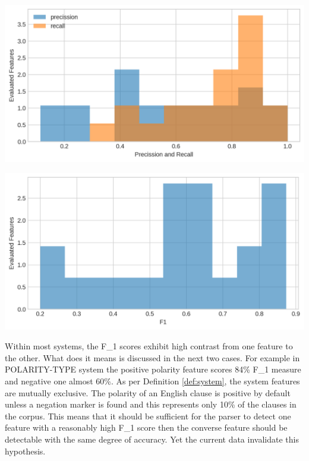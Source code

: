     \begin{minipage}[t]{0.475\textwidth}
        \centering
        \includegraphics[width=\textwidth]{evaluation-results/figures/accuracy-syntactic-mood-precission-recall.png}
        \label{fig:mood-precission-recall}
    \end{minipage}
    \quad
    \begin{minipage}[t]{0.475\textwidth}
        \centering
        \includegraphics[width=\textwidth]{evaluation-results/figures/accuracy-syntactic-mood-f1.png}
        \label{fig:mood-precission-f1}
    \end{minipage}

Within most systems, the F_1 scores exhibit high contrast from one feature to the other. What does it means is discussed in the next two cases. For example in POLARITY-TYPE system the positive polarity feature scores 84\% F_1 measure and negative one almost 60\%. As per Definition \ref{def:system}, the system features are mutually exclusive. The polarity of an English clause is positive by default unless a negation marker is found and this represents only 10\% of the clauses in  the corpus. This means that it should be sufficient for the parser to detect one feature with a reasonably high F_1 score then the converse feature should be detectable with the same degree of accuracy. Yet the current data invalidate this hypothesis. 

